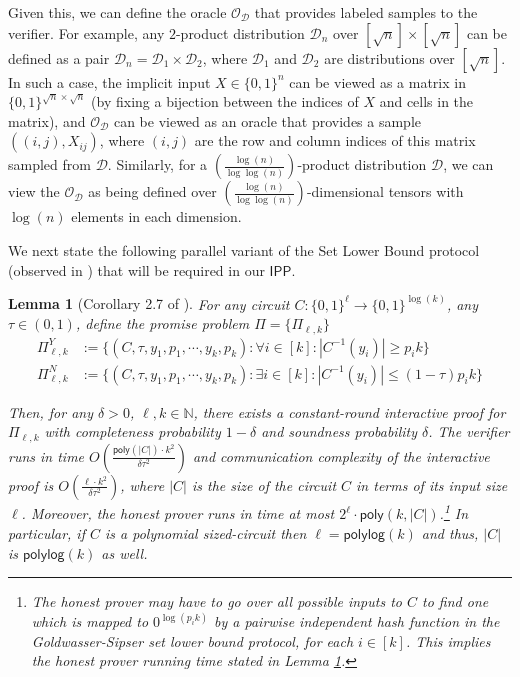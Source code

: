 \documentclass[11pt]{article}
\newtheorem{lemma}[theorem]{Lemma}
\newcommand{\poly}{\mathsf{poly}}
\newcommand{\polylog}{\mathsf{polylog}}
\newcommand{\IPP}{\mathsf{IPP}}
\newcommand{\N}{\mathbb{N}}
\newcommand{\sD}{\mathcal{D}}
\newcommand{\sO}{\mathcal{O}}
\begin{document}
Given this, we can define the oracle $\sO_\sD$ that provides labeled samples to the verifier. For example, any $2$-product distribution $\sD_n$ over $[\sqrt{n}] \times [\sqrt{n}]$ can be defined as a pair $\sD_n = \sD_1 \times \sD_2$, where $\sD_1$ and $\sD_2$ are distributions over $[\sqrt{n}]$. In such a case, the implicit input $X \in \{0,1\}^n$ can be viewed as a matrix in $\{0,1\}^{\sqrt{n} \times \sqrt{n}}$ (by fixing a bijection between the indices of $X$ and cells in the matrix), and $\sO_\sD$ can be viewed as an oracle that provides a sample $((i,j),X_{ij})$, where $(i,j)$ are the row and column indices of this matrix sampled from $\sD$. Similarly, for a $\left( \frac{\log (n)}{\log \log (n)} \right)$-product distribution $\sD$, we can view the $\sO_\sD$ as being defined over $\left( \frac{\log (n)}{\log \log (n)} \right)$-dimensional tensors with $\log (n)$ elements in each dimension. 

\vspace{0.1in}
We next state the following parallel variant of the Set Lower Bound protocol \cite{GS86} (observed in \cite{BT06}) that will be required in our $\IPP$.

\begin{lemma}[Corollary 2.7 of \cite{BT06}]
    \label{lem:lb_bt06}
    For any circuit $C:\{0,1\}^\ell \rightarrow\{0,1\}^{\log (k)}$, any $\tau \in (0,1)$, define the promise problem $\Pi = \{\Pi_{\ell,k}\}$
    \begin{equation*}
        \begin{split}
        \Pi^{Y}_{\ell,k} &:=\{(C,\tau,y_{1},p_{1},\cdots, y_{k},p_{k}):\forall i\in[k]:|C^{-1}(y_{i})|\geq p_i k\}\\
        \Pi^{N}_{\ell,k} &:=\{(C,\tau,y_{1},p_{1},\cdots, y_{k},p_{k}):\exists i\in[k]:|C^{-1}(y_{i})| \leq (1-\tau)p_{i}k\}
        \end{split}    
    \end{equation*}

    Then, for any $\delta > 0$, $\ell, k \in \N$, there exists a constant-round interactive proof for $\Pi_{\ell,k}$ with completeness probability $1-\delta$ and soundness probability $\delta$. The verifier runs in time $O \left( \frac{\poly(\vert C \vert) \cdot k^2}{\delta \tau^2} \right)$ and communication complexity of the interactive proof is $O \left( \frac{\ell \cdot k^2}{\delta \tau^2} \right)$, where $\vert C \vert$ is the size of the circuit $C$ in terms of its input size $\ell$. Moreover, the honest prover runs in time at most $2^\ell \cdot \poly(k,\vert C \vert)$.\footnote{The honest prover may have to go over all possible inputs to $C$ to find one which is mapped to $0^{\log (p_i k)}$ by a pairwise independent hash function in the Goldwasser-Sipser set lower bound protocol, for each $i \in [k]$. This implies the honest prover running time stated in Lemma \ref{lem:lb_bt06}.} In particular, if $C$ is a polynomial sized-circuit then $\ell = \polylog(k)$ and thus, $\vert C \vert$ is $\polylog(k)$ as well.
\end{lemma}
\end{document}
